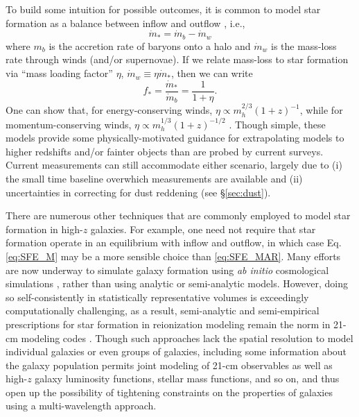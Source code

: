 To build some intuition for possible outcomes, it is common to model star formation as a balance between inflow and outflow \cite{Bouche2010,Dave2012,Dekel2014}, i.e.,
\begin{equation}
	\dot{m}_{\ast} = \dot{m}_b - \dot{m}_w
\end{equation}
where $m_b$ is the accretion rate of baryons onto a halo and $\dot{m}_w$ is the mass-loss rate through winds (and/or supernovae). If we relate mass-loss to star formation via ``mass loading factor'' $\eta$, $\dot{m}_w \equiv \eta \dot{m}_{\ast}$, then we can write
\begin{equation}
	f_{\ast} = \frac{\dot{m}_{\ast}}{\dot{m}_b} = \frac{1}{1 + \eta} .
\end{equation}
One can show that, for energy-conserving winds, $\eta \propto m_h^{2/3} (1+z)^{-1}$, while for momentum-conserving winds, $\eta \propto m_h^{1/3} (1+z)^{-1/2}$ \cite{Dayal2014,Furlanetto2017}. Though simple, these models provide some physically-motivated guidance for extrapolating models to higher redshifts and/or fainter objects than are probed by current surveys. Current measurements can still accommodate either scenario, largely due to (i) the small time baseline overwhich measurements are available and (ii) uncertainties in correcting for dust reddening (see \S\ref{sec:dust}).

There are numerous other techniques that are commonly employed to model star formation in high-$z$ galaxies. For example, one need not require that star formation operate in an equilibrium with inflow and outflow, in which case Eq. \ref{eq:SFE_M} may be a more sensible choice than \ref{eq:SFE_MAR}. Many efforts are now underway to simulate galaxy formation using \textit{ab initio} cosmological simulations \cite{Vogelsberger2014,Schaye2015,Hopkins2014,OShea2015,Gnedin2014}, rather than using analytic or semi-analytic models. However, doing so self-consistently in statistically representative volumes is exceedingly computationally challenging, as a result, semi-analytic and semi-empirical prescriptions for star formation in reionization modeling remain the norm in 21-cm modeling codes \cite{Mirocha2017,Park2019,Mutch2016}. Though such approaches lack the spatial resolution to model individual galaxies or even groups of galaxies, including some information about the galaxy population permits joint modeling of 21-cm observables as well as high-$z$ galaxy luminosity functions, stellar mass functions, and so on, and thus open up the possibility of tightening constraints on the properties of galaxies using a multi-wavelength approach.

